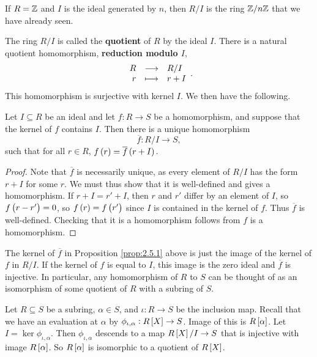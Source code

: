 \pagebreak

\begin{example*}
If $ R = \mathbb{Z} $ and $ I $ is the ideal generated by $ n $, then $ R / I $ is the ring $ \mathbb{Z} / n\mathbb{Z} $ that we have already seen.
\end{example*}

The ring $ R / I $ is called the \textbf{quotient} of $ R $ by the ideal $ I $. There is a natural quotient homomorphism, \textbf{reduction modulo $ I $},
$$ \function{R}{R / I}{r}{r + I}. $$
This homomorphism is surjective with kernel $ I $. We then have the following.

\begin{proposition}
\label{prop:2.5.1}
Let $ I \subseteq R $ be an ideal and let $ f : R \to S $ be a homomorphism, and suppose that the kernel of $ f $ contains $ I $. Then there is a unique homomorphism
$$ \overline{f} : R / I \to S, $$
such that for all $ r \in R $, $ f\br{r} = \overline{f}\br{r + I} $.
\end{proposition}

\begin{proof}
Note that $ \overline{f} $ is necessarily unique, as every element of $ R / I $ has the form $ r + I $ for some $ r $. We must thus show that it is well-defined and gives a homomorphism. If $ r + I = r' + I $, then $ r $ and $ r' $ differ by an element of $ I $, so $ f\br{r - r'} = 0 $, so $ f\br{r} = f\br{r'} $ since $ I $ is contained in the kernel of $ f $. Thus $ \overline{f} $ is well-defined. Checking that it is a homomorphism follows from $ f $ is a homomorphism.
\end{proof}

\begin{note*}
The kernel of $ \overline{f} $ in Proposition \ref{prop:2.5.1} above is just the image of the kernel of $ f $ in $ R / I $. If the kernel of $ f $ is equal to $ I $, this image is the zero ideal and $ \overline{f} $ is injective. In particular, any homomorphism of $ R $ to $ S $ can be thought of as an isomorphism of some quotient of $ R $ with a subring of $ S $.
\end{note*}

\begin{example*}
Let $ R \subseteq S $ be a subring, $ \alpha \in S $, and $ \iota : R \to S $ be the inclusion map. Recall that we have an evaluation at $ \alpha $ by $ \phi_{\iota, \alpha} : R\sbr{X} \to S $. Image of this is $ R\sbr{\alpha} $. Let $ I = \ker \phi_{\iota, \alpha} $. Then $ \phi_{\iota, \alpha} $ descends to a map $ R\sbr{X} / I \to S $ that is injective with image $ R\sbr{\alpha} $. So $ R\sbr{\alpha} $ is isomorphic to a quotient of $ R\sbr{X} $.
\end{example*}

